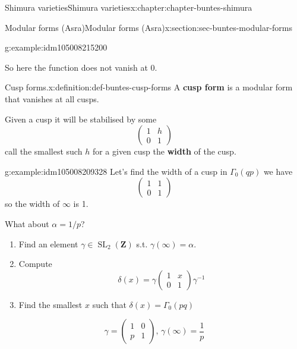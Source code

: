 \documentclass[oneside,10pt,]{book}
\newcommand{\terminology}[1]{\textbf{#1}}
\numberwithin{equation}{section}
\newcommand{\inv}{^{-1}}
\newcommand{\ZZ}{\mathbf{Z}}
\DeclareMathOperator{\SL}{SL}
\newcommand{\amp}{&}
\begin{document}
\begin{chapterptx}{Shimura varieties}{}{Shimura varieties}{}{}{x:chapter:chapter-buntes-shimura}
\begin{sectionptx}{Modular forms (Asra)}{}{Modular forms (Asra)}{}{}{x:section:sec-buntes-modular-forms}
\begin{example}{}{g:example:idm105008215200}
\begin{equation*}
\end{equation*}
%
\par
So here the function does not vanish at 0.%
\end{example}
\begin{definition}{Cusp forms.}{x:definition:def-buntes-cusp-forms}%
A \terminology{cusp form} is a modular form that vanishes at all cusps.%
\end{definition}
Given a cusp it will be stabilised by some%
\begin{equation*}
\begin{pmatrix} 1\amp h \\ 0 \amp 1 \end{pmatrix}
\end{equation*}
call the smallest such \(h\) for a given cusp the \terminology{width} of the cusp.%
\begin{example}{}{g:example:idm105008209328}%
Let's find the width of a cusp in \(\Gamma_0(qp)\) we have%
\begin{equation*}
\begin{pmatrix} 1\amp 1 \\ 0 \amp 1 \end{pmatrix}
\end{equation*}
so the width of \(\infty\) is 1.%
\par
What about \(\alpha = 1/p\)?%
\begin{enumerate}
\item{}Find an element \(\gamma \in \SL_2(\ZZ)\) s.t. \(\gamma(\infty) = \alpha\).%
\item{}Compute%
\begin{equation*}
\delta(x) = \gamma \begin{pmatrix} 1\amp x \\ 0 \amp 1 \end{pmatrix} \gamma\inv
\end{equation*}
%
\item{}Find the smallest \(x\) such that \(\delta(x) = \Gamma_0(pq)\)%
\end{enumerate}
%
\begin{equation*}
\gamma = \begin{pmatrix} 1\amp 0 \\ p \amp 1 \end{pmatrix},\, \gamma(\infty) = \frac 1p
\end{equation*}
%
\begin{equation*}

\end{equation*}
\end{example}
\end{sectionptx}
\end{chapterptx}
\end{document}

